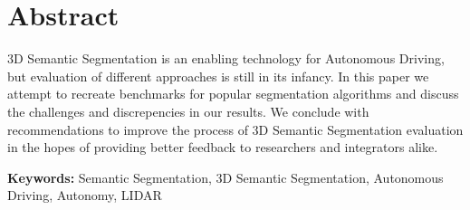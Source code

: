 \section*{Abstract}

3D Semantic Segmentation is an enabling technology for Autonomous Driving, but evaluation of different approaches is still in its infancy. In this paper we attempt to recreate benchmarks for popular segmentation algorithms and discuss the challenges and discrepencies in our results. We conclude with recommendations to improve the process of 3D Semantic Segmentation evaluation in the hopes of providing better feedback to researchers and integrators alike.

\vspace{.5cm}

\textbf{Keywords:} Semantic Segmentation, 3D Semantic Segmentation, Autonomous Driving, Autonomy, LIDAR
\newpage
